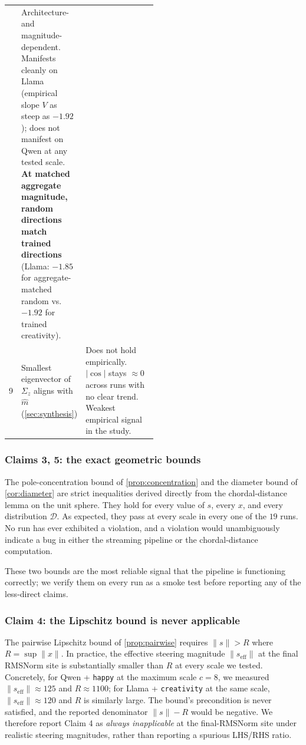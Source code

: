 \begin{table}[htbp]
\begin{tabular}{@{}llp{0.50\linewidth}@{}}
      & Architecture- and magnitude-dependent. Manifests cleanly on Llama (empirical slope $V$ as steep as $-1.92$); does not manifest on Qwen at any tested scale. \textbf{At matched aggregate magnitude, random directions match trained directions} (Llama: $-1.85$ for aggregate-matched random vs.\ $-1.92$ for trained creativity). \\
    9 & Smallest eigenvector of $\Sigma_z$ aligns with $\hat{m}$ (\ref{sec:synthesis})
      & Does not hold empirically. $|\cos|$ stays $\approx 0$ across runs with no clear trend. Weakest empirical signal in the study. \\
    \bottomrule
  \end{tabular}
\end{table}

\subsubsection{Claims 3, 5: the exact geometric bounds}

The pole-concentration bound of \ref{prop:concentration} and the diameter bound of \ref{cor:diameter} are strict inequalities derived directly from the chordal-distance lemma on the unit sphere. They hold for every value of $s$, every $x$, and every distribution $\mathcal{D}$. As expected, they pass at every scale in every one of the $19$ runs. No run has ever exhibited a violation, and a violation would unambiguously indicate a bug in either the streaming pipeline or the chordal-distance computation.

These two bounds are the most reliable signal that the pipeline is functioning correctly; we verify them on every run as a smoke test before reporting any of the less-direct claims.

\subsubsection{Claim 4: the Lipschitz bound is never applicable}
\label{sec:claim4-inapplicable}

The pairwise Lipschitz bound of \ref{prop:pairwise} requires $\|s\| > R$ where $R = \sup \|x\|$. In practice, the effective steering magnitude $\|s_\mathrm{eff}\|$ at the final RMSNorm site is substantially smaller than $R$ at every scale we tested. Concretely, for Qwen + \texttt{happy} at the maximum scale $c=8$, we measured $\|s_\mathrm{eff}\| \approx 125$ and $R \approx 1100$; for Llama + \texttt{creativity} at the same scale, $\|s_\mathrm{eff}\| \approx 120$ and $R$ is similarly large. The bound's precondition is never satisfied, and the reported denominator $\|s\| - R$ would be negative. We therefore report Claim 4 as \emph{always inapplicable} at the final-RMSNorm site under realistic steering magnitudes, rather than reporting a spurious LHS/RHS ratio.


